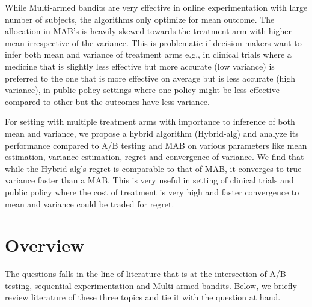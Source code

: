\documentclass[letterpaper,11pt]{article}
\begin{document}
While Multi-armed bandits are very effective in online experimentation with large number of subjects, the algorithms only optimize for mean outcome. The allocation in MAB's is heavily skewed towards the treatment arm with higher mean irrespective of the variance. This is problematic if decision makers want to infer both mean and variance of treatment arms e.g., in clinical trials where a medicine that is slightly less effective but more accurate (low variance) is preferred to the one that is more effective on average but is less accurate (high variance), in public policy settings where one policy might be less effective compared to other but the outcomes have less variance.

For setting with multiple treatment arms with importance to inference of both mean and variance, we propose a hybrid algorithm (Hybrid-alg) and analyze its performance compared to A/B testing and MAB on various parameters like mean estimation, variance estimation, regret and convergence of variance. We find that while the Hybrid-alg's regret is comparable to that of MAB, it converges to true variance faster than a MAB. This is very useful in setting of clinical trials and public policy where the cost of treatment is very high and faster convergence to mean and variance could be traded for regret.



\begin{comment}
  
\end{comment}
 
 


\section{Overview}
\label{sec:headings}

The questions falls in the line of literature that is at the intersection of A/B testing, sequential experimentation and Multi-armed bandits. Below, we briefly review literature of these three topics and tie it with the question at hand. 
\end{document}
